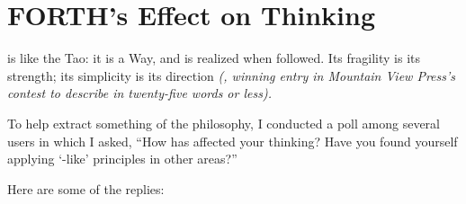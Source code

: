 \epilog{}
\chapter{
FORTH's Effect
on Thinking}
\begin{tfquot}
\Forth{} is like the Tao: it is a Way, and is realized when followed.  Its
fragility is its strength; its simplicity is its direction
\emph{(, winning entry in Mountain View Press's
contest to describe \Forth{} in twenty-five words or less).}
\end{tfquot}

To help extract something of the \Forth{} philosophy, I conducted a poll
among several \Forth{} users in which I asked, ``How has \Forth{} affected
your thinking?  Have you found yourself applying `\Forth{}-like' 
principles in other areas?''

Here are some of the replies:

